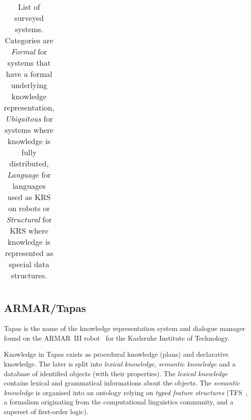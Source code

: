 \documentclass{IEEEtran}
\begin{document}
\begin{landscape}
\begin{table}
\begin{center}
\begin{tabular}{p{2.2cm}p{1.6cm}p{4cm}lp{2.4cm}p{3.4cm}p{1.5cm}}

\bottomrule

\end{tabular}
\end{center}

\caption{List of surveyed systems. Categories are \emph{Formal} for systems
that have a formal underlying knowledge representation, \emph{Ubiquitous} for
systems where knowledge is fully distributed, \emph{Language} for languages
used as KRS on robots or \emph{Structural} for KRS where knowledge is
represented as special data structures.}

\label{table|surveyed-systems}
\end{table}
\end{landscape}


\subsection{ARMAR/Tapas}

{\sc Tapas} is the name of the knowledge representation system and dialogue
manager found on the ARMAR~III robot~\cite{Holzapfel2008} for the Karlsruhe
Institute of Technology.

Knowledge in {\sc Tapas} exists as procedural knowledge (plans) and declarative
knowledge. The later is split into \emph{lexical knowledge}, \emph{semantic
knowledge} and a database of identified objects (with their properties). The
\emph{lexical knowledge} contains lexical and grammatical informations about
the objects. The \emph{semantic knowledge} is organised into an ontology
relying on \emph{typed feature structures} (TFS~\cite{Carpenter1992}, a
formalism originating from the computational linguistics community, and a
superset of first-order logic).
\end{document}
